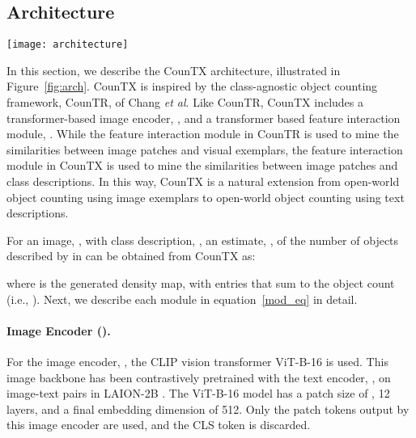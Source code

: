 \documentclass{bmvc2k}
\def\etal{\emph{et al}\bmvaOneDot}
\begin{document}
\subsection{Architecture}\label{arch}

\begin{figure*}
\centering
\texttt{[image: architecture]}
\vspace{-7mm}
   \caption{The CounTX architecture. The input image and class description are encoded by a vision transformer and a text transformer respectively. The image features are then passed to the feature interaction module to compute the query vectors, and the text feature is passed in to compute the key and value vectors. The output of the feature interaction module is reshaped to a spatial feature map that is upsampled in the decoder module to produce a density map with the same height and width as the input image and entries that sum to the object count.}
\label{fig:arch}
\vspace{-2mm}
\end{figure*}

In this section, we describe the CounTX architecture,  illustrated in Figure~\ref{fig:arch}. CounTX is inspired by the class-agnostic object counting framework, CounTR, of Chang \etal \cite{Liu2022CounTRTG}. Like CounTR, CounTX includes a transformer-based image encoder, , and a transformer based feature interaction module, . While the feature interaction module in CounTR is used to mine the similarities between image patches and visual exemplars, the feature interaction module in CounTX is used to mine the similarities between image patches and class descriptions. In this way, CounTX is a natural extension from open-world object counting using image exemplars to open-world object counting using text descriptions.

For an image, , with class description, , an estimate, , of the number of objects described by  in  can be obtained from CounTX as:

where   is the generated density map, with entries that sum to the object count (i.e., ). Next, we describe each module in equation~\ref{mod_eq} in detail.

\paragraph{Image Encoder ().}
For the image encoder, , the CLIP vision transformer ViT-B-16 \cite{Radford2021LearningTV, ilharco_gabriel_2021_5143773} is used. This image backbone has been contrastively pretrained with the text encoder, , on image-text pairs in LAION-2B \cite{schuhmann2022laionb}. The ViT-B-16 model has a patch size of , 12 layers, and a final embedding dimension of 512. Only the patch tokens output by this image encoder are used, and the CLS token is discarded. 
\end{document}
